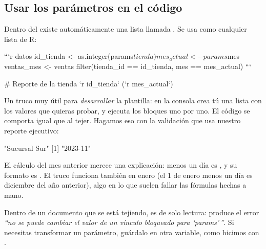 \subsection{Usar los parámetros en el código}

Dentro del  existe automáticamente una lista llamada
. Se usa como cualquier lista de R:

\begin{textocodigo}
```{r datos}
id_tienda  <- as.integer(params$tienda)
mes_actual <- params$mes
ventas_mes <- ventas %
  filter(tienda_id == id_tienda, mes == mes_actual)
```

# Reporte de la tienda `r id_tienda` (`r mes_actual`)
\end{textocodigo}

Un truco muy útil para \emph{desarrollar} la plantilla: en la consola crea
tú una lista  con los valores que quieras probar, y ejecuta
los bloques uno por uno. El código se comporta igual que al tejer. Hagamos
eso con la validación que usa nuestro reporte ejecutivo:

\begin{rsalida}
[1] "Sucursal Sur"
[1] "2023-11"
\end{rsalida}

El cálculo del mes anterior merece una explicación: 
menos un día es , y su formato  es
. El truco funciona también en enero (el 1 de enero menos
un día es diciembre del año anterior), algo en lo que suelen fallar las
fórmulas hechas a mano.

\begin{advertencia}
Dentro de un documento que se está tejiendo,  es de solo
lectura:  produce el error \emph{``no se puede
cambiar el valor de un vínculo bloqueado para `params'\,''}. Si necesitas
transformar un parámetro, guárdalo en otra variable, como hicimos con
.
\end{advertencia}

